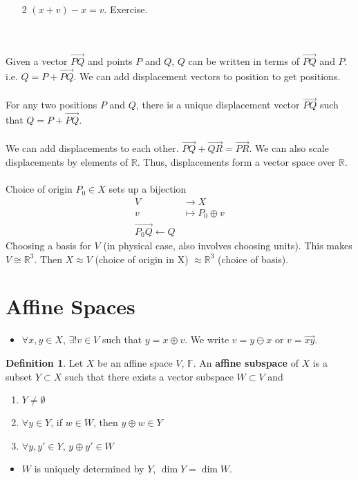 \documentclass[letterpaper,12pt]{article}
\theoremstyle{definition}
\newtheorem*{definition}{Definition}
\renewcommand{\vec}[1]{\overrightarrow{#1}} %
\begin{document}
\begin{enumerate}
    \item[2] $(x + v) - x = v$. Exercise. 
\end{enumerate}



\\ \\ Given a vector $\vec{PQ}$ and points $P$ and $Q$, $Q$ can be written in terms of $\vec{PQ}$ and $P$. i.e. $Q = P + \vec{PQ}$. We can add displacement vectors to position to get positions.
\\ \\ For any two positions $P$ and $Q$, there is a unique displacement vector $\vec{PQ}$ such that $Q = P + \vec{PQ}$.
\\ \\ We can add displacements to each other. $\vec{PQ} + \vec{QR} = \vec{PR}$. We can also scale displacements by elements of $\mathbb{R}$. Thus, displacements form a vector space over $\mathbb{R}$.
\\ \\ Choice of origin $P_0 \in X$ sets up a bijection
\begin{align*}
    V & \longrightarrow X \\
    v & \longmapsto P_0 \oplus v \\
    \vec{P_0 Q} \longleftarrow Q
\end{align*}
Choosing a basis for $V$ (in physical case, also involves choosing units). This makes $V \cong \mathbb{R}^3$. Then $X \approx V$ (choice of origin in X) $\approx \mathbb{R}^3$ (choice of basis).

\section*{Affine Spaces}

\begin{itemize}
    \item $\forall x, y \in X$, $\exists ! v \in V$ such that $y = x \oplus v$. We write $v = y \ominus x$ or $v = \vec{xy}$.
\end{itemize}

\begin{definition}
Let $X$ be an affine space $V$, $\mathbb{F}$. An \textbf{affine subspace} of $X$ is a subset $Y \subset X$ such that there exists a vector subspace $W \subset V$ and
\begin{enumerate}
    \item $Y \neq \emptyset$
    \item $\forall y \in Y$, if $w \in W$, then $y \oplus w \in Y$
    \item $\forall y, y' \in Y$, $y \oplus y' \in W$
\end{enumerate}
\begin{itemize}
    \item $W$ is uniquely determined by $Y$, $\dim{Y} = \dim{W}$.
\end{itemize}
\end{definition}
\end{document}
